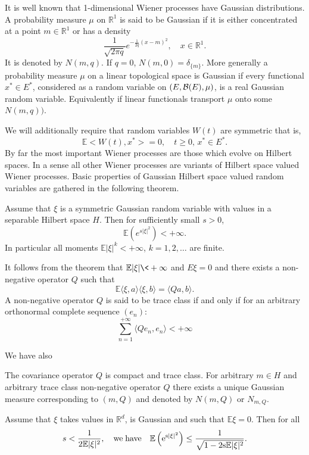 \documentclass[preprint]{imsart}
\def\E{\mathbb E}
\def\R{\mathbb R}
\begin{document}
{\noindent It is well known that 1-dimensional Wiener processes have Gaussian
distributions.  A probability measure $\mu$ on $\R^1$ is said to be Gaussian
if it is either concentrated at a point $m\in \R^1$ or has a density
$$
\frac{1}{\sqrt{2\pi q}} e^{-\frac{1}{2q}(x-m)^2}, \quad x \in \R^1.
$$
It is denoted by $N(m,q)$.  If $q = 0$, $N(m,0) = \delta_{\{m\} }$.  More
generally a probability measure $\mu$ on a linear topological space is
Gaussian if every functional  $x^* \in E^*$, considered as a random variable on $(E,{\cal
B}(E),\mu)$, is a real Gaussian random variable. Equivalently if linear functionals transport
$\mu$ onto some $N(m,q))$.

We will additionally require that random variables $W(t)$ are  symmetric that is,
$$
\E < W(t), x^* > = 0, \quad t \geq 0,\, x^* \in
E^*.
$$
By far the most important Wiener processes are those which evolve on Hilbert
spaces.  In a sense all other Wiener processes are variants of Hilbert space
valued Wiener processes.  Basic properties of Gaussian Hilbert space valued
random variables are gathered in the following theorem.

\begin{Theorem}
Assume that $\xi$ is a symmetric Gaussian random variable with values in a separable
Hilbert space $H$.  Then for sufficiently small $s > 0$,
$$
\E \left( e^{s |\xi|^2 } \right) < +\infty.
$$
In particular all moments $\E |\xi|^k < +\infty$, $k = 1,2,\ldots$ are finite.
\end{Theorem}
It follows from the theorem that $\E |\xi| \< +\infty$ and $E\xi =0$ and
there exists a non-negative operator $Q$ such that
$$
    \E \langle \xi , a \rangle \langle \xi , b \rangle =
    \langle Qa, b \rangle.
$$
A non-negative operator $Q$ is said to be trace class if and only if
for an arbitrary orthonormal complete sequence $(e_n)$:
$$
\sum_{n=1}^{+\infty} \langle Qe_n, e_n \rangle < +\infty
$$

We have also
\begin{Theorem}
\label{thrm:Gaussian-moments} The covariance operator $Q$ is compact and trace
class. For arbitrary $m \in H$ and arbitrary trace
class non-negative  operator $Q$ there exists a unique Gaussian
 measure corresponding to
$(m,Q)$ and denoted by  $N(m,Q)$ or $N_{m,Q}$.
\end{Theorem}

\begin{Lemma}
Assume that $\xi$ takes values in $\R^d$, is Gaussian and such that $\E\xi =
0$.  Then for all
$$
    s < {\frac{1}{2\E|\xi|^2}}, \quad \rm{we \; have}\quad
    \E\left(e^{s|\xi|^2}\right) \leq \frac{1}{\sqrt{1 - 2s \E |\xi|^2}}.
$$
\end{Lemma}

}
\end{document}
